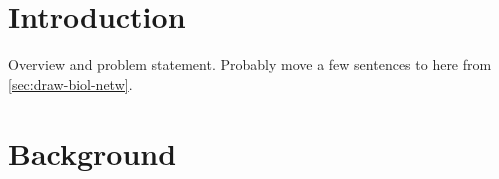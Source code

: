 \documentclass[
	fontsize=10pt, %
	twoside=false, %
	secnumdepth=1, %
]{kaobook}
\begin{document}
\listoftables %

\endgroup


\mainmatter %


\chapter{Introduction}
Overview and problem statement. Probably move a few sentences to here from  \ref{sec:draw-biol-netw}.






\chapter{Background}
\end{document}
